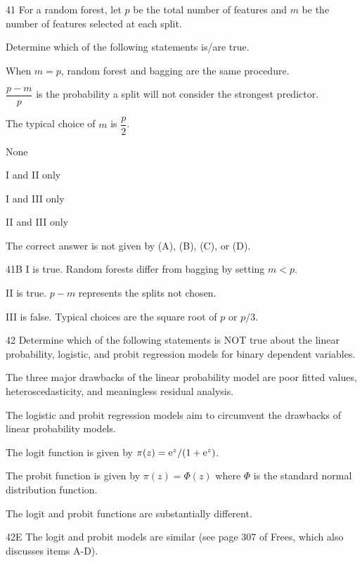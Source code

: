 \begin{question}{41}
For a random forest, let $p$ be the total number of features and $m$ be the number of features selected at each split.

Determine which of the following statements is/are true.
\begin{statements}
\item When $m = p$, random forest and bagging are the same procedure.
\item $\dfrac{p-m}{p}$ is the probability a split will not consider the strongest predictor.
\item The typical choice of $m$ is $\dfrac{p}{2}$.
\end{statements}

\begin{choices}
\item None
\item I and II only
\item I and III only
\item II and III only
\item The correct answer is not given by (A), (B), (C), or (D).
\end{choices}
\end{question}
\begin{solution}{41}{B}
I is true. Random forests differ from bagging by setting $m < p$.

II is true. $p - m$ represents the splits not chosen.

III is false. Typical choices are the square root of $p$ or $p/3$.
\end{solution}

\begin{question}{42}
Determine which of the following statements is NOT true about the linear probability, logistic, and probit regression models for binary dependent variables.

\begin{choices}
\item The three major drawbacks of the linear probability model are poor fitted values, heteroscedasticity, and meaningless residual analysis.
\item The logistic and probit regression models aim to circumvent the drawbacks of linear probability models.
\item The logit function is given by $\pi(z) = \mathrm{e}^{z} / (1 + \mathrm{e}^{z})$.
\item The probit function is given by $\pi(z) = \Phi(z)$ where $\Phi$ is the standard normal distribution function.
\item The logit and probit functions are substantially different.
\end{choices}
\end{question}
\begin{solution}{42}{E}
The logit and probit models are similar (see page 307 of Frees, which also discusses items A-D).
\end{solution}

